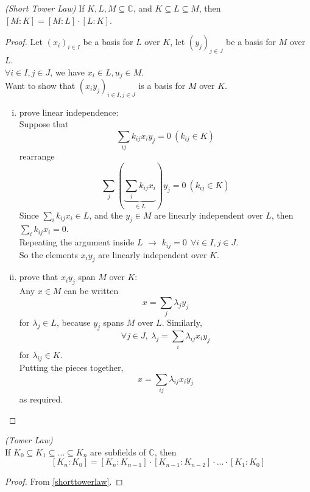 \documentclass{article}
\theoremstyle{definition}
\newenvironment{thm}[1]
{\renewcommand\theinnerthm{#1}\innerthm}
{\endinnerthm}
\newenvironment{cor}[1]
{\renewcommand\theinnercor{#1}\innercor}
{\endinnercor}
\begin{document}
\begin{thm}{6.4}\emph{(Short Tower Law)} \label{shorttowerlaw}
  If $K, L, M \subseteq \mathbb{C}$, and $K \subseteq L \subseteq M$, then $[M:K]=[M:L]\cdot [L:K]$.
\end{thm}
\begin{proof}
  Let $(x_i)_{i \in I}$ be a basis for $L$ over $K$,
  let $(y_j)_{j \in J}$ be a basis for $M$ over $L$.\\
  $\forall i \in I, j \in J$, we have $x_i \in L, u_j \in M$.
  \\
  Want to show that $(x_i y_j)_{i\in I, j\in J}$ is a basis for $M$ over $K$.
  \begin{enumerate}[i.]
    \item prove linear independence:\\
      Suppose that
      $$\sum_{ij} k_{ij} x_i y_j = 0 ~(k_{ij} \in K)$$
      rearrange
      $$\sum_j (\underbrace{\sum_i k_{ij} x_i}_{\in L}) y_j = 0 ~(k_{ij} \in K)$$
      Since $\sum_i k_{ij} x_i \in L$, and the $y_j \in M$ are linearly independent over $L$, then $\sum_i k_{ij} x_i = 0$.
      \\
      Repeating the argument inside $L$ $\longrightarrow$ $k_{ij}=0 ~~\forall i\in I, j\in J$.
      \\
      So the elements $x_i y_j$ are linearly independent over $K$.

    \item prove that $x_i y_j$ span $M$ over $K$:\\
      Any $x \in M$ can be written
      $$x=\sum_j \lambda_j y_j$$
      for $\lambda_j \in L$, because $y_j$ spans $M$ over $L$.
      Similarly,
      $$\forall j\in J,~ \lambda_j = \sum_i \lambda_{ij} x_i y_j$$
      for  $\lambda_{ij} \in K$.\\
      Putting the pieces together,
      $$x=\sum_{ij} \lambda_{ij} x_i y_j$$
      as required.
  \end{enumerate}
\end{proof}

\begin{cor}{6.6}\emph{(Tower Law)}\\ \label{towerlaw}
  If $K_0 \subseteq K_1 \subseteq \ldots \subseteq K_n$ are subfields of $\mathbb{C}$, then
  $$[K_n:K_0] = [K_n:K_{n-1}] \cdot [K_{n-1}:K_{n-2}] \cdot \ldots \cdot [K_1: K_0]$$
\end{cor}
\begin{proof}
  From \ref{shorttowerlaw}.
\end{proof}
\end{document}
